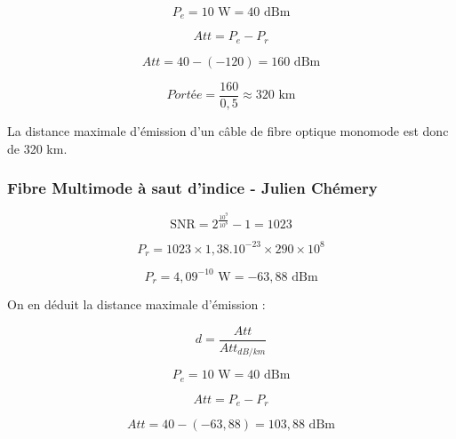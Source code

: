 \documentclass[12]{article}
\begin{document}
\begin{equation*}
    P_e = 10 \text{ W} = 40 \text{ dBm}
\end{equation*}

\begin{equation*}
    Att = P_e - P_r
\end{equation*}
    
\begin{equation*}
    Att = 40 - \left( -120 \right) = 160 \text{ dBm}
\end{equation*}

\begin{equation*}
    Portée = \frac{160}{0,5} \approx 320 \text{ km}
\end{equation*}

La distance maximale d'émission d'un câble de fibre optique monomode est donc de 320 km.

\subsubsection{Fibre Multimode à saut d'indice - Julien Chémery}


\begin{equation*}
    \text{SNR} = 2^{ \frac{10^9}{10^{8}}} -1 = 1023
\end{equation*}

\begin{equation*}
    P_r = 1023 \times 1,38.10^{-23} \times 290 \times 10^{8}
\end{equation*}

\begin{equation*}
    P_r = 4,09^{-10} \text{ W} = -63,88 \text{ dBm}
\end{equation*}

On en déduit la distance maximale d'émission : 

\begin{equation*}
    d = \frac{Att}{Att_{dB/km}}
\end{equation*}

\begin{equation*}
    P_e = 10 \text{ W} = 40 \text{ dBm}
\end{equation*}

\begin{equation*}
    Att = P_e - P_r
\end{equation*}
    
\begin{equation*}
    Att = 40 - \left( -63,88 \right) = 103,88 \text{ dBm}
\end{equation*}
\end{document}
